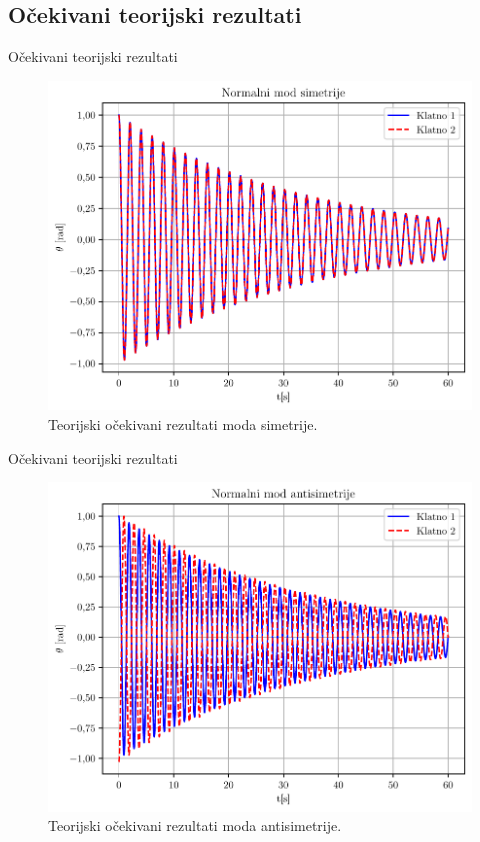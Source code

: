 \documentclass[aspectratio=169,xcolor=dvipsnames]{beamer}
\begin{document}

\subsection{Očekivani teorijski rezultati}

\begin{frame}{Očekivani teorijski rezultati}
    \begin{figure}
    \includegraphics[width=0.5\linewidth]{master_fig/nmod_simetrija.pdf}
    \caption{Teorijski očekivani rezultati moda simetrije.}
    \end{figure}
\end{frame}


\begin{frame}{Očekivani teorijski rezultati}
    \begin{figure}
    \includegraphics[width=0.5\linewidth]{master_fig/nmod_asimetrija.pdf}
    \caption{Teorijski očekivani rezultati moda antisimetrije.}
    \end{figure}
\end{frame}

\end{document}
